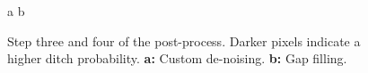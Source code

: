 \documentclass[11pt, review]{elsarticle} %
\begin{document}
\begin{figure} [!htb]
    \centering
    a{
        }\hspace{5pt}
    b{
        }
    \caption{Step three and four of the post-process. Darker pixels indicate a higher ditch probability. \textbf{a: }Custom de-noising. \textbf{b: }Gap filling.}
    \label{fig:postprocessing2}
\end{figure}
\end{document}
